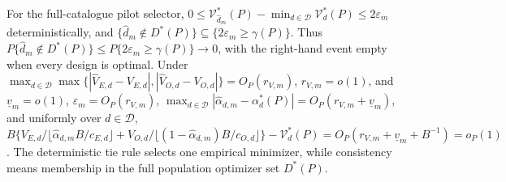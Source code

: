 For the full-catalogue pilot selector, \(0\le\mathcal V_{\widehat d_m}^*(P)-\min_{d\in\mathcal D}\mathcal V_d^*(P)\le2\varepsilon_m\) deterministically, and \(\{\widehat d_m\notin D^*(P)\}\subseteq\{2\varepsilon_m\ge\gamma(P)\}\). Thus \(P\{\widehat d_m\notin D^*(P)\}\le P\{2\varepsilon_m\ge\gamma(P)\}\to0\), with the right-hand event empty when every design is optimal. Under \(\max_{d\in\mathcal D}\max\{|\widehat V_{E,d}-V_{E,d}|,|\widehat V_{O,d}-V_{O,d}|\}=O_P(r_{V,m})\), \(r_{V,m}=o(1)\), and \(\underline v_m=o(1)\), \(\varepsilon_m=O_P(r_{V,m})\), \(\max_{d\in\mathcal D}|\widehat\alpha_{d,m}-\alpha_d^*(P)|=O_P(r_{V,m}+\underline v_m)\), and uniformly over \(d\in\mathcal D\), \(B\{V_{E,d}/\lfloor\widehat\alpha_{d,m}B/c_{E,d}\rfloor+V_{O,d}/\lfloor(1-\widehat\alpha_{d,m})B/c_{O,d}\rfloor\}-\mathcal V_d^*(P)=O_P(r_{V,m}+\underline v_m+B^{-1})=o_P(1)\). The deterministic tie rule selects one empirical minimizer, while consistency means membership in the full population optimizer set \(D^*(P)\).